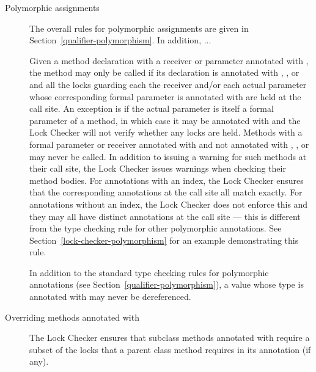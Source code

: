 \begin{description}

\item[Polymorphic assignments]
  The overall rules for polymorphic assignments are given in
  Section~\ref{qualifier-polymorphism}.  In addition, ...




\item[]
  Given a method declaration with a receiver or parameter annotated with
  , the method may only be called if its declaration is
  annotated with , , 
  or  and
  all the locks guarding each the receiver and/or each actual parameter whose
  corresponding formal parameter is annotated with 
  are held at the call site.  An exception is if the actual parameter is itself
  a formal parameter of a method, in which case it may be annotated with 
  and the Lock Checker will not verify whether any locks are held.
  Methods with a formal parameter or receiver annotated with 
  and not annotated with , , 
  or  may never be called. In addition to issuing a warning for such methods
  at their call site, the Lock Checker issues warnings when checking their method bodies.
  For  annotations with an index, the Lock Checker ensures that the
  corresponding  annotations at the call site all match exactly.
  For  annotations without an index, the Lock Checker does not enforce
  this and they may all have distinct  annotations at the call site ---
  this is different from the type checking rule for other polymorphic annotations.
  See Section~\ref{lock-checker-polymorphism} for an example demonstrating this rule.

\item[]
  In addition to the standard type checking rules for polymorphic annotations
  (see Section~\ref{qualifier-polymorphism}), a value whose type is annotated with
   may never be dereferenced.

\item[Overriding methods annotated with ]
  The Lock Checker ensures that subclass methods annotated with
   require a subset of the locks that a parent
  class method requires in its  annotation (if any).


\end{description}
